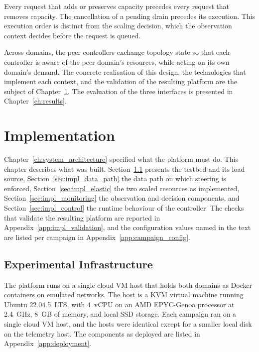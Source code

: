 ﻿\documentclass[12pt,reqno,twoside]{amsbook}
\begin{document}
Every request that adds or preserves capacity
precedes every request that removes capacity. The cancellation of a
pending drain precedes its execution. 
This execution order is distinct from
the scaling decision, which the observation context decides before the
request is queued.

Across domains, the peer controllers exchange topology state so that each
controller is aware of the peer domain's resources, while acting on its own
domain's demand. The concrete realisation of this design, the technologies
that implement each context, and the validation of the resulting platform
are the subject of Chapter~\ref{ch:implementation}. The evaluation of the
three interfaces is presented in Chapter~\ref{ch:results}.


\chapter{Implementation}\label{ch:implementation}
Chapter~\ref{ch:system_architecture} specified what the platform must do.
This chapter describes what was built. Section~\ref{sec:impl_infrastructure}
presents the testbed and its load source, Section~\ref{sec:impl_data_path}
the data path on which steering is enforced, Section~\ref{sec:impl_elastic} the
two scaled resources as implemented, Section~\ref{sec:impl_monitoring} the
observation and decision components, and Section~\ref{sec:impl_control} the
runtime behaviour of the controller. The checks that validate the resulting
platform are reported in Appendix~\ref{app:impl_validation}, and the
configuration values named in the text are listed per campaign in
Appendix~\ref{app:campaign_config}.

\section{Experimental Infrastructure}\label{sec:impl_infrastructure}

The platform runs on a single cloud VM host that holds both domains as Docker
containers on emulated networks. The host is a KVM virtual machine running
Ubuntu 22.04.5~LTS, with 4~vCPU on an AMD EPYC-Genoa processor at 2.4~GHz,
8~GB of memory, and local SSD storage. Each campaign ran on a single cloud VM
host, and the hosts were identical except for a smaller local disk on the
telemetry host. The components as deployed are
listed in Appendix~\ref{app:deployment}.

\end{document}
